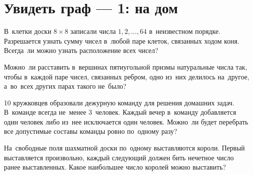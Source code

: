 
\section*{Увидеть граф --- 1: на дом}




\begin{problems}

В~клетки доски $8 \times 8$ записали числа $1, 2, \ldots, 64$ в~неизвестном
порядке.
Разрешается узнать сумму чисел в~любой паре клеток, связанных ходом коня.
Всегда~ли можно узнать расположение всех чисел?

Можно~ли расставить в~вершинах пятиугольной призмы натуральные числа так, чтобы
в~каждой паре чисел, связанных ребром, одно из~них делилось на~другое,
а~во~всех других парах такого не~было?

10 кружковцев образовали дежурную команду для решения домашних задач.
В~команде всегда не~менее 3~человек.
Каждый вечер в~команду добавляется один человек либо из~нее исключается один
человек.
Можно~ли будет перебрать все допустимые составы команды ровно по~одному разу?

На~свободные поля шахматной доски по~одному выставляются короли.
Первый выставляется произвольно, каждый следующий должен бить нечетное число
ранее выставленных.
Какое наибольшее число королей можно выставить?

\end{problems}

